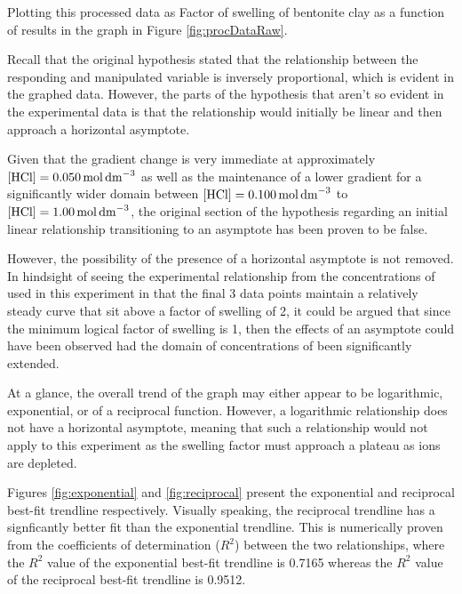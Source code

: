 \documentclass[11pt, letterpaper]{article}
\begin{document}
Plotting this processed data as Factor of swelling of bentonite clay as a function
of \ce{[HCl]} results in the graph in Figure \ref*{fig:procDataRaw}.



Recall that the original hypothesis stated that the relationship between
the responding and manipulated variable is inversely proportional,
which is evident in the graphed data. However, the parts of the hypothesis
that aren't so evident in the experimental data is that
the relationship would initially be linear and then approach
a horizontal asymptote.

Given that the gradient change is very immediate at approximately \(\ce{[HCl]} = \SI{0.050}{mol.dm^{-3}}\)
as well as the maintenance of a lower gradient for a significantly wider domain
between \(\ce{[HCl]} = \SI{0.100}{mol.dm^{-3}}\) to \(\ce{[HCl]} = \SI{1.00}{mol.dm^{-3}}\),
the original section of the hypothesis regarding an initial linear relationship
transitioning to an asymptote has been proven to be false.

However, the possibility of the presence of a horizontal asymptote is not
removed. In hindsight of seeing the experimental relationship from the concentrations
of  used in this experiment in that the final 3 data points maintain
a relatively steady curve that sit above a factor of swelling of 2,
it could be argued that since the minimum logical factor of swelling is 1, then the effects of an asymptote could have been observed had
the domain of concentrations of  been significantly extended.

At a glance, the overall trend of the graph may either appear to be logarithmic,
exponential, or of a reciprocal function. However, a logarithmic relationship
does not have a horizontal asymptote, meaning that such a relationship would
not apply to this experiment as the swelling factor must approach a plateau
as  ions are depleted.

Figures \ref*{fig:exponential} and \ref*{fig:reciprocal} present the
exponential and reciprocal best-fit trendline respectively.
Visually speaking, the reciprocal trendline has a signficantly
better fit than the exponential trendline. This is numerically
proven from the coefficients of determination (\(R^2\)) between the two
relationships, where the \(R^2\) value of the exponential best-fit trendline
is 0.7165 whereas the \(R^2\) value of the reciprocal best-fit trendline
is 0.9512.
\end{document}
